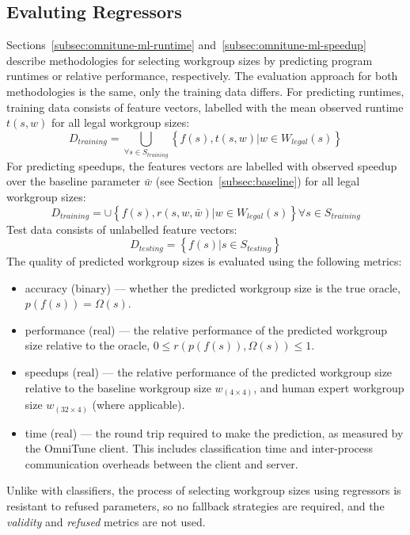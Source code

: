 \subsection{Evaluting Regressors}

Sections~\ref{subsec:omnitune-ml-runtime}
and~\ref{subsec:omnitune-ml-speedup} describe methodologies for
selecting workgroup sizes by predicting program runtimes or relative
performance, respectively. The evaluation approach for both
methodologies is the same, only the training data differs. For
predicting runtimes, training data consists of feature vectors,
labelled with the mean observed runtime $t(s,w)$ for all legal
workgroup sizes:
%
\begin{equation}
  D_{training} = \bigcup_{\forall s \in S_{training}} \left\{ f(s),t(s,w) | w \in W_{legal}(s)
  \right\}
\end{equation}
For predicting speedups, the features vectors are labelled with
observed speedup over the baseline parameter $\bar{w}$ (see
Section~\ref{subsec:baseline}) for all legal workgroup sizes:
\begin{equation}
  D_{training} = \cup \left\{ f(s),r(s,w,\bar{w}) | w \in W_{legal}(s)
  \right\} \forall s \in S_{training}
\end{equation}
%
Test data consists of unlabelled feature vectors:
%
\begin{equation}
  D_{testing} = \left\{ f(s) | s \in S_{testing} \right\}
\end{equation}
%
The quality of predicted workgroup sizes is evaluated using the
following metrics:
%
\begin{itemize}
\item accuracy (binary) --- whether the predicted workgroup size is
  the true oracle, $p(f(s)) = \Omega(s)$.
\item performance (real) --- the relative performance of the predicted
  workgroup size relative to the oracle,
  $0 \le r(p(f(s)), \Omega(s)) \le 1$.
\item speedups (real) --- the relative performance of the predicted
  workgroup size relative to the baseline workgroup size
  $w_{(4 \times 4)}$, and human expert workgroup size
  $w_{(32 \times 4)}$ (where applicable).
\item time (real) --- the round trip required to make the prediction,
  as measured by the OmniTune client. This includes classification
  time and inter-process communication overheads between the client
  and server.
\end{itemize}
%
Unlike with classifiers, the process of selecting workgroup sizes
using regressors is resistant to refused parameters, so no fallback
strategies are required, and the \emph{validity} and \emph{refused}
metrics are not used.


